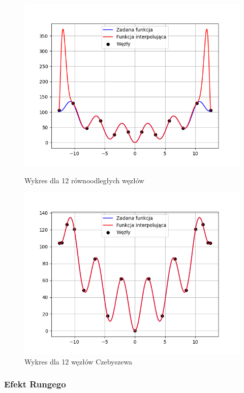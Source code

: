\documentclass{article}
\begin{document}
\begin{figure}[H]
  \begin{minipage}[b]{0.49\textwidth}
    \includegraphics[width=\textwidth]{img15.png}
    \caption{Wykres dla 12 równoodległych węzłów}
  \end{minipage}
  \hfill
  \begin{minipage}[b]{0.49\textwidth}
    \includegraphics[width=\textwidth]{img16.png}
    \caption{Wykres dla 12 węzłów Czebyszewa}
  \end{minipage}
\end{figure}

\subsubsection{Efekt Rungego}
\end{document}
